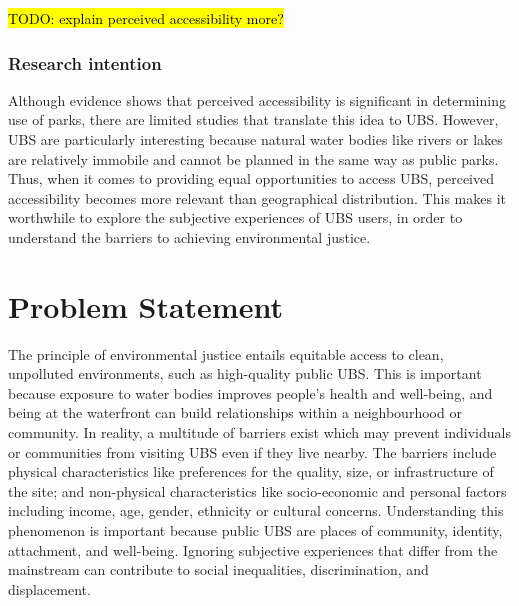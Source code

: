 \documentclass{article}
\begin{document}
\hl{TODO: explain perceived accessibility more?}

\subsubsection{Research intention}

Although evidence shows that perceived accessibility is significant in determining use of parks, there are limited studies that translate this idea to UBS.
However, UBS are particularly interesting because natural water bodies like rivers or lakes are relatively immobile and cannot be planned in the same way as public parks. 
Thus, when it comes to providing equal opportunities to access UBS, perceived accessibility becomes more relevant than geographical distribution. 
This makes it worthwhile to explore the subjective experiences of UBS users, in order to understand the barriers to achieving environmental justice.


\section{Problem Statement}

The principle of environmental justice entails equitable access to clean, unpolluted environments, such as high-quality public UBS. This is important because exposure to water bodies improves people's health and well-being, and being at the waterfront can build relationships within a neighbourhood or community.
In reality, a multitude of barriers exist which may prevent individuals or communities from visiting UBS even if they live nearby. The barriers include physical characteristics like preferences for the quality, size, or infrastructure of the site; and non-physical characteristics like socio-economic and personal factors including income, age, gender, ethnicity or cultural concerns.
Understanding this phenomenon is important because public UBS are places of community, identity, attachment, and well-being. Ignoring subjective experiences that differ from the mainstream can contribute to social inequalities, discrimination, and displacement.
\end{document}

